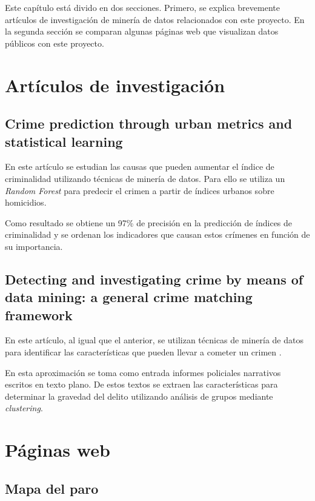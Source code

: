 
Este capítulo está divido en dos secciones. Primero, se explica brevemente artículos de investigación de minería de datos relacionados con este proyecto. En la segunda sección se comparan algunas páginas web que visualizan datos públicos con este proyecto.

\section{Artículos de investigación}

\subsection{Crime prediction through urban metrics and statistical learning}

En este artículo se estudian las causas que pueden aumentar el índice de criminalidad utilizando técnicas de minería de datos. Para ello se utiliza un \textit{Random Forest} para predecir el crimen a partir de índices urbanos sobre homicidios. \cite{art:crimeprediction}

Como resultado se obtiene un 97\% de precisión en la predicción de índices de criminalidad y se ordenan los indicadores que causan estos crímenes en función de su importancia.

\subsection{Detecting and investigating crime by means of data mining: a general crime matching framework}

En este artículo, al igual que el anterior, se utilizan técnicas de minería de datos para identificar las características que pueden llevar a cometer un crimen \cite{art:crimeprediction2}.

En esta aproximación se toma como entrada informes policiales narrativos escritos en texto plano. De estos textos se extraen las características para determinar la gravedad del delito utilizando análisis de grupos mediante \textit{clustering}.

\section{Páginas web}

\subsection{Mapa del paro}

